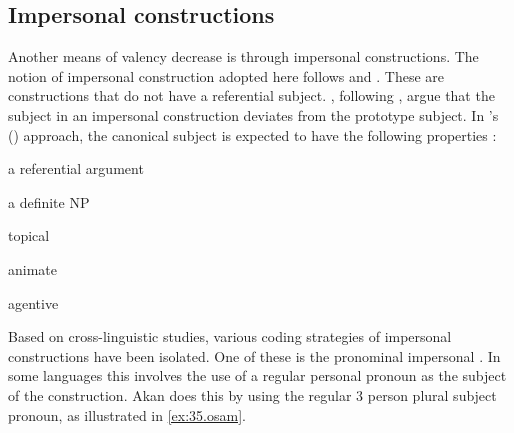 \documentclass[output=paper]{langsci/langscibook}
\begin{document}
\ea
\label{ex:34.osam}
	\z

	\z
\z


\subsection{Impersonal constructions}\label{§4.4:impersonal.osam}

Another means of valency decrease is through impersonal constructions. The notion of impersonal construction adopted here follows \citet{siewierska2008,siewierska2011} and \citet{malchukovogawa2011}. These are constructions that do not have a referential subject. \citet{malchukovogawa2011}, following \citet{keenan1976}, argue that the subject in an impersonal construction deviates from the prototype subject. In \citeauthor{keenan1976}'s (\citeyear{keenan1976}) approach, the canonical subject is expected to have the following properties \citep[23]{malchukovogawa2011}:

\indent a referential argument

\indent a definite NP

\indent topical

\indent animate

\indent agentive

Based on cross-linguistic studies, various coding strategies of impersonal constructions have been isolated. One of these is the pronominal impersonal \citep{siewierska2011}. In some languages this involves the use of a regular personal pronoun as the subject of the construction. Akan does this by using the regular 3 person plural subject pronoun, as illustrated in \ref{ex:35.osam}.

\ea
\label{ex:35.osam}
	\z
\end{document}
